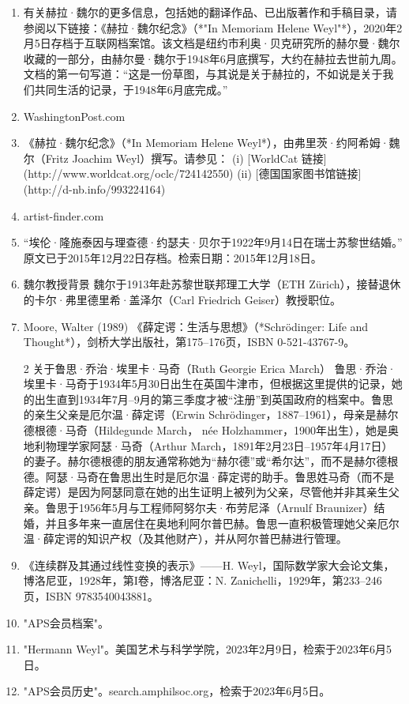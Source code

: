 \begin{enumerate}
\item 有关赫拉·魏尔的更多信息，包括她的翻译作品、已出版著作和手稿目录，请参阅以下链接：《赫拉·魏尔纪念》（*"In Memoriam Helene Weyl"*），2020年2月5日存档于互联网档案馆。该文档是纽约市利奥·贝克研究所的赫尔曼·魏尔收藏的一部分，由赫尔曼·魏尔于1948年6月底撰写，大约在赫拉去世前九周。文档的第一句写道：“这是一份草图，与其说是关于赫拉的，不如说是关于我们共同生活的记录，于1948年6月底完成。”  
\item WashingtonPost.com
\item 《赫拉·魏尔纪念》（*In Memoriam Helene Weyl*），由弗里茨·约阿希姆·魏尔（Fritz Joachim Weyl）撰写。请参见：  
(i) [WorldCat 链接](http://www.worldcat.org/oclc/724142550)  
(ii) [德国国家图书馆链接](http://d-nb.info/993224164)  
\item artist-finder.com
\item “埃伦·隆施泰因与理查德·约瑟夫·贝尔于1922年9月14日在瑞士苏黎世结婚。”  
原文已于2015年12月22日存档。检索日期：2015年12月18日。  
\item 魏尔教授背景 魏尔于1913年赴苏黎世联邦理工大学（ETH Zürich），接替退休的卡尔·弗里德里希·盖泽尔（Carl Friedrich Geiser）教授职位。
\item Moore, Walter (1989) 《薛定谔：生活与思想》（*Schrödinger: Life and Thought*），剑桥大学出版社，第175–176页，ISBN 0-521-43767-9。  
\item [2] 关于鲁思·乔治·埃里卡·马奇（Ruth Georgie Erica March）  
鲁思·乔治·埃里卡·马奇于1934年5月30日出生在英国牛津市，但根据这里提供的记录，她的出生直到1934年7月–9月的第三季度才被“注册”到英国政府的档案中。鲁思的亲生父亲是厄尔温·薛定谔（Erwin Schrödinger，1887–1961），母亲是赫尔德根德·马奇（Hildegunde March， née Holzhammer，1900年出生），她是奥地利物理学家阿瑟·马奇（Arthur March，1891年2月23日–1957年4月17日）的妻子。赫尔德根德的朋友通常称她为“赫尔德”或“希尔达”，而不是赫尔德根德。阿瑟·马奇在鲁思出生时是厄尔温·薛定谔的助手。鲁思姓马奇（而不是薛定谔）是因为阿瑟同意在她的出生证明上被列为父亲，尽管他并非其亲生父亲。鲁思于1956年5月与工程师阿努尔夫·布劳尼泽（Arnulf Braunizer）结婚，并且多年来一直居住在奥地利阿尔普巴赫。鲁思一直积极管理她父亲厄尔温·薛定谔的知识产权（及其他财产），并从阿尔普巴赫进行管理。
\item 《连续群及其通过线性变换的表示》——H. Weyl，国际数学家大会论文集，博洛尼亚，1928年，第I卷，博洛尼亚：N. Zanichelli，1929年，第233–246页，ISBN 9783540043881。
\item "APS会员档案"。
\item "Hermann Weyl"。美国艺术与科学学院，2023年2月9日，检索于2023年6月5日。
\item "APS会员历史"。search.amphilsoc.org，检索于2023年6月5日。

\end{enumerate}
